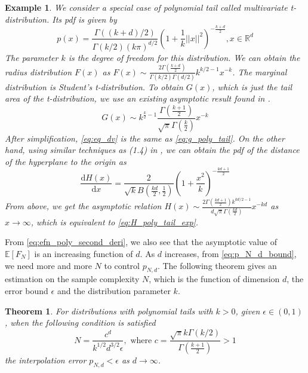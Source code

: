 \documentclass[conference,a4paper]{IEEEtran}
\def\E{\mathbb{E}}
\def\dd{\mathrm{d}}
\newtheorem{theorem}{Theorem}
\newtheorem{example}{Example}
\begin{document}
\begin{example}
     We consider a special case of polynomial tail called multivariate t-distribution.
     Its pdf is given by
     \begin{equation}\label{eq:pxy_student_t}
          p(x) = \frac{\Gamma((k+d)/2)}{\Gamma(k/2)(k\pi)^{d/2}}
          \left(1+\frac{1}{k}||x||^2
          \right)^{-\frac{k+d}{2}}, x \in \mathbb{R}^d
      \end{equation}
      The parameter $k$ is the degree of freedom for this distribution.
      We can obtain the radius distribution
      $F(x)$ as $F(x) \sim \frac{2\Gamma(\frac{k+d}{2})}{\Gamma(k/2)\Gamma(d/2)} k^{k/2-1} x^{-k}$.
      The marginal distribution is Student's t-distribution. To obtain $G(x)$, which is just the tail area
of the t-distribution, we use an existing asymptotic result found in \cite{andrew1976}.
\begin{equation} \label{eq:eq_dv}
    G(x) \sim k^{\frac{k}{2}-1} \frac{\Gamma \left(\frac{k+1}{2} \right)}
    {\sqrt{\pi} \Gamma\left(\frac{k}{2}\right)}x^{-k}
\end{equation}
After simplification, \eqref{eq:eq_dv} is the same as \eqref{eq:g_poly_tail}.
On the other hand, using similar techniques as (1.4) in \cite{raynaud1970enveloppe},
we can obtain the pdf of the distance of the hyperplane to the origin as
\begin{equation}\label{eq:dH_dx_t_distribution}
     \frac{\dd H(x)}{\dd x} =  \frac{2}{\sqrt{k} B(\frac{kd}{2},\frac{1}{2})} \left(1 + \frac{x^2}{k} \right)^{-\frac{kd+1}{2}} 
\end{equation}
From above, we get the asymptotic relation $H(x) \sim \frac{2 \Gamma(\frac{kd+1}{2}) k^{kd/2-1}}{d\sqrt{\pi} \Gamma(\frac{kd}{2})}
x^{-kd}$ as $x\to \infty$, which is equivalent to \eqref{eq:H_poly_tail_exp}.

\end{example}
From \eqref{eq:efn_poly_second_deri}, we also see that
the asymptotic value of $\E[F_N]$ is an increasing function of $d$.
As $d$ increases, from \eqref{eq:p_N_d_bound}, we need more and more $N$ to control $p_{N,d}$.
The following theorem gives an estimation on the sample complexity $N$,
which is the function of dimension $d$, the error bound $\epsilon$ and the distribution parameter $k$.
\begin{theorem}\label{thm:poly_tail_sample_complexity}
  For distributions with polynomial tails with $k>0$, given $\epsilon \in (0,1)$,
  when the following condition is satisfied
\begin{equation}\label{eq:N_c_d_3_2}
  N = \frac{c^d}{k^{1/2}d^{3/2} \epsilon}, \textrm{ where } c=\frac{\sqrt{\pi}k\Gamma(k/2)}{\Gamma(\frac{k+1}{2})}>1  
\end{equation}
the interpolation error $p_{N,d} < \epsilon$ as $d\to \infty$.
\end{theorem}
\end{document}
